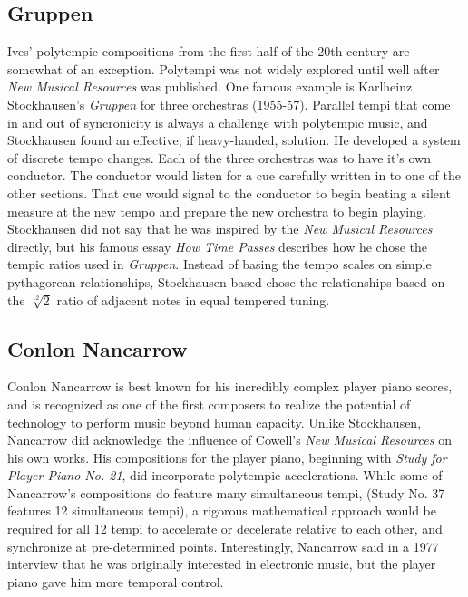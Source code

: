 \subsection{Gruppen}
\label{sec:gruppen}
Ives' polytempic compositions from the first half of the 20th century
are somewhat of an exception. Polytempi was not widely explored until
well after \textit{New Musical Resources} was published. One famous
example is Karlheinz Stockhausen's \textit{Gruppen} for three
orchestras (1955-57). Parallel tempi that come in and out of
syncronicity is always a challenge with polytempic music, and
Stockhausen found an effective, if heavy-handed, solution. He
developed a system of discrete tempo changes. Each of the three
orchestras was to have it's own conductor. The conductor would listen
for a cue carefully written in to one of the other sections. That cue
would signal to the conductor to begin beating a silent measure at the
new tempo and prepare the new orchestra to begin playing.  Stockhausen
did not say that he was inspired by the \textit{New Musical Resources}
directly, but his famous essay \textit{How Time Passes} describes how
he chose the tempic ratios used in \textit{Gruppen}. Instead of basing
the tempo scales on simple pythagorean relationships, Stockhausen
based chose the relationships based on the $\sqrt[12]{2}$ ratio of
adjacent notes in equal tempered tuning.


\subsection{Conlon Nancarrow}
\label{sec:conlon-nancarrow}
Conlon Nancarrow is best known for his incredibly complex player piano
scores, and is recognized as one of the first composers to realize the
potential of technology to perform music beyond human capacity. Unlike
Stockhausen, Nancarrow did acknowledge the influence of Cowell's
\textit{New Musical Resources} on his own works. His compositions for
the player piano, beginning with \textit{Study for Player Piano
  No. 21}, did incorporate polytempic
accelerations\cite{Rao2005}. While some of Nancarrow's compositions do
feature many simultaneous tempi, (Study No. 37 features 12
simultaneous tempi)\cite{Greschak2003}, a rigorous mathematical
approach would be required for all 12 tempi to accelerate or
decelerate relative to each other, and synchronize at pre-determined
points. Interestingly, Nancarrow said in a 1977 interview that he was
originally interested in electronic music, but the player piano gave
him more temporal control.\cite{Amirkhanian1977}


